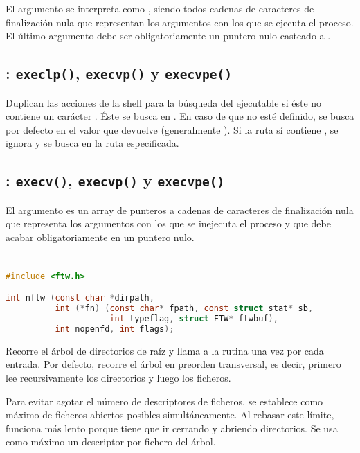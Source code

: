 El argumento  se interpreta como , siendo todos cadenas de caracteres de finalización nula que representan los argumentos con los que se ejecuta el proceso.
El último argumento debe ser obligatoriamente un puntero nulo casteado a .

\subsection{: \texttt{execlp()}, \texttt{execvp()} y \texttt{execvpe()}}

Duplican las acciones de la shell para la búsqueda del ejecutable si éste no contiene un carácter \code{/}.
Éste se busca en .
En caso de que no esté definido, se busca por defecto en el valor que devuelve  (generalmente ).
Si la ruta sí contiene \code{/}, se ignora  y se busca en la ruta especificada.

\subsection{: \texttt{execv()}, \texttt{execvp()} y \texttt{execvpe()}}

El argumento  es un array de punteros a cadenas de caracteres de finalización nula que representa los argumentos con los que se inejecuta el proceso y que debe acabar obligatoriamente en un puntero nulo.

\section{}\label{ntfw}

\begin{lstlisting}[language=C]
#include <ftw.h>

int nftw (const char *dirpath,
          int (*fn) (const char* fpath, const struct stat* sb,
                     int typeflag, struct FTW* ftwbuf),
          int nopenfd, int flags);
\end{lstlisting}

Recorre el árbol de directorios de raíz  y llama a la rutina  una vez por cada entrada.
Por defecto, recorre el árbol en preorden transversal, es decir, primero lee recursivamente los directorios y luego los ficheros.

Para evitar agotar el número de descriptores de ficheros, se establece  como máximo de ficheros abiertos posibles simultáneamente.
Al rebasar este límite,  funciona más lento porque tiene que ir cerrando y abriendo directorios.
Se usa como máximo un descriptor por fichero del árbol.


